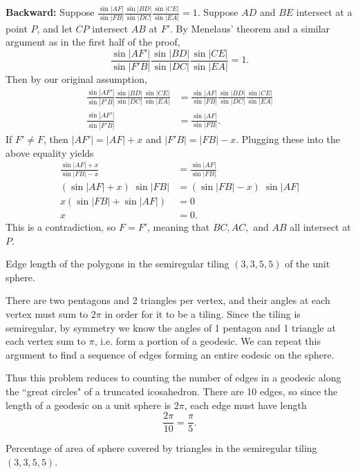 \documentclass[twoside,10pt]{article}
\begin{document}
\textbf{Backward:} Suppose $\frac{\sin|AF|}{\sin|FB|} \frac{\sin|BD|}{\sin|DC|} \frac{\sin|CE|}{\sin|EA|} =1$. Suppose $AD$ and $BE$ intersect at a point $P$, and let $CP$ intersect $AB$ at $F'$. By Menelaus' theorem and a similar argument as in the first half of the proof,
\[
\frac{\sin|AF'|}{\sin|F'B|} \frac{\sin|BD|}{\sin|DC|} \frac{\sin|CE|}{\sin|EA|} =1.
\] Then by our original assumption,
\begin{align*}
	\frac{\sin|AF'|}{\sin|F'B|} \frac{\sin|BD|}{\sin|DC|} \frac{\sin|CE|}{\sin|EA|} &= \frac{\sin|AF|}{\sin|FB|} \frac{\sin|BD|}{\sin|DC|} \frac{\sin|CE|}{\sin|EA|} \\
	\frac{\sin|AF'|}{\sin|F'B|} &= \frac{\sin|AF|}{\sin|FB|}.
\end{align*}
If $F' \neq F$, then $|AF'| = |AF|+x$ and $|F'B|=|FB|-x$. Plugging these into the above equality yields
\begin{align*}
	\frac{\sin|AF|+x}{\sin|FB|-x} &= \frac{\sin|AF|}{\sin|FB|} \\
	(\sin|AF|+x) \; \sin|FB| &= (\sin|FB|-x) \; \sin|AF| \\
	x(\sin|FB|+\sin|AF|) &= 0 \\
	x &= 0.
\end{align*}
This is a contradiction, so $F = F'$, meaning that $BC, AC,$ and $AB$ all intersect at $P$.

\newpage

\begin{exer}[10.35]
	Edge length of the polygons in the semiregular tiling $(3,3,5,5)$ of the unit sphere.
\end{exer}

	There are two pentagons and 2 triangles per vertex, and their angles at each vertex must sum to $2\pi$ in order for it to be a tiling. Since the tiling is semiregular, by symmetry we know the angles of 1 pentagon and 1 triangle at each vertex sum to $\pi$, i.e. form a portion of a geodesic. We can repeat this argument to find a sequence of edges forming an entire eodesic on the sphere.

	Thus this problem reduces to counting the number of edges in a geodesic along the ``great circles" of a truncated icosahedron. There are 10 edges, so since the length of a geodesic on a unit sphere is $2\pi$, each edge must have length 
	\[
	\frac{2\pi}{10} = \frac{\pi}{5} .
	\] 

\newpage

\begin{exer}[10.36]
	Percentage of area of sphere covered by triangles in the semiregular tiling $(3,3,5,5)$.
\end{exer}
\end{document}
